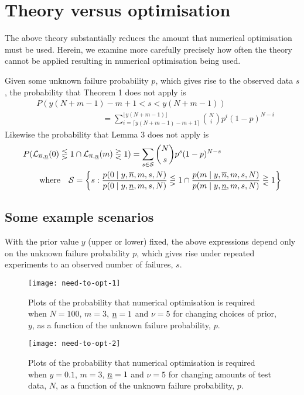 \documentclass[12pt, a4paper]{elsarticle}
\begin{document}
\section{Theory versus optimisation}
\label{ap:needtoopt}

The above theory substantially reduces the amount that numerical optimisation must be used.  Herein, we examine more carefully precisely how often the theory cannot be applied resulting in numerical optimisation being used.

Given some unknown failure probability $p$, which gives rise to the observed data $s$, the probability that Theorem 1 does not apply is
\begin{align*}
  &P(y(N+m-1)-m+1 < s < y(N+m-1)) \\
  &\qquad \qquad \qquad \qquad = \sum_{i = \lceil y(N+m-1)-m+1 \rceil}^{\lfloor y(N+m-1) \rfloor} \binom{N}{i} p^i (1-p)^{N-i}
\end{align*}
Likewise the probability that Lemma 3 does not apply is
\begin{align*}
  &P(\mathcal{L}_{\overline{n},\underline{n}}(0) \lesseqgtr 1 \cap \mathcal{L}_{\overline{n},\underline{n}}(m) \gtreqless 1) = \sum_{s \in \mathcal{S}} \binom{N}{s} p^s (1-p)^{N-s} \\
  &\qquad\mbox{where}\quad \mathcal{S} = \left\{ s : \frac{p(0 \mid y, \overline{n}, m, s, N)}{p(0 \mid y, \underline{n}, m, s, N)} \lesseqgtr 1 \cap \frac{p(m \mid y, \overline{n}, m, s, N)}{p(m \mid y, \underline{n}, m, s, N)} \gtreqless 1 \right\}
\end{align*}

\subsection{Some example scenarios}

With the prior value $y$ (upper or lower) fixed, the above expressions depend only on the unknown failure probability $p$, which gives rise under repeated experiments to an observed number of failures, $s$.

\begin{figure}
\texttt{[image: need-to-opt-1]}
\caption{Plots of the probability that numerical optimisation is required when $N=100$, $m=3$, $\underline{n}=1$ and $\nu=5$ for changing choices of prior, $y$, as a function of the unknown failure probability, $p$.}
\label{fig:need-to-opt-1}
\end{figure}

\begin{figure}
\texttt{[image: need-to-opt-2]}
\caption{Plots of the probability that numerical optimisation is required when $y=0.1$, $m=3$, $\underline{n}=1$ and $\nu=5$ for changing amounts of test data, $N$, as a function of the unknown failure probability, $p$.}
\label{fig:need-to-opt-2}
\end{figure}
\end{document}
